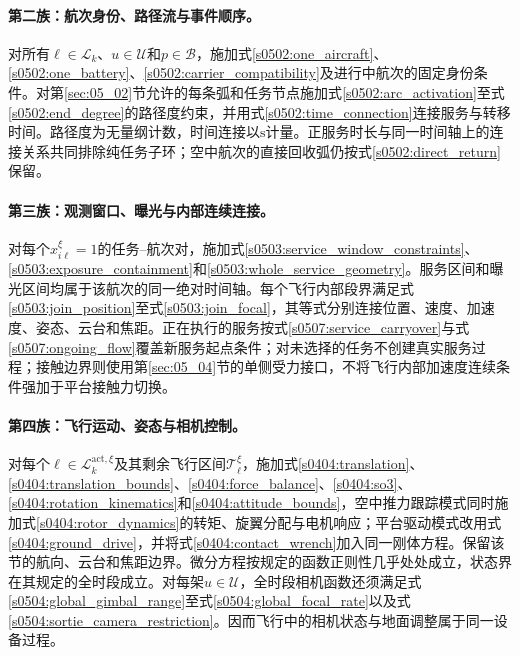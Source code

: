 \paragraph{第二族：航次身份、路径流与事件顺序。}
对所有$\ell\in\mathcal L_k$、$u\in\mathcal U$和$p\in\mathcal B$，施加式\eqref{s0502:one_aircraft}、\eqref{s0502:one_battery}、\eqref{s0502:carrier_compatibility}及进行中航次的固定身份条件。对第\ref{sec:05_02}节允许的每条弧和任务节点施加式\eqref{s0502:arc_activation}至式\eqref{s0502:end_degree}的路径度约束，并用式\eqref{s0502:time_connection}连接服务与转移时间。路径度为无量纲计数，时间连接以$\mathrm s$计量。正服务时长与同一时间轴上的连接关系共同排除纯任务子环；空中航次的直接回收弧仍按式\eqref{s0502:direct_return}保留。

\paragraph{第三族：观测窗口、曝光与内部连续连接。}
对每个$x_{i\ell}^\xi=1$的任务--航次对，施加式\eqref{s0503:service_window_constraints}、\eqref{s0503:exposure_containment}和\eqref{s0503:whole_service_geometry}。服务区间和曝光区间均属于该航次的同一绝对时间轴。每个飞行内部段界满足式\eqref{s0503:join_position}至式\eqref{s0503:join_focal}，其等式分别连接位置、速度、加速度、姿态、云台和焦距。正在执行的服务按式\eqref{s0507:service_carryover}与式\eqref{s0507:ongoing_flow}覆盖新服务起点条件；对未选择的任务不创建真实服务过程；接触边界则使用第\ref{sec:05_04}节的单侧受力接口，不将飞行内部加速度连续条件强加于平台接触力切换。

\paragraph{第四族：飞行运动、姿态与相机控制。}
对每个$\ell\in\mathcal L_k^{\mathrm{act},\xi}$及其剩余飞行区间$\mathcal T_\ell^\xi$，施加式\eqref{s0404:translation}、\eqref{s0404:translation_bounds}、\eqref{s0404:force_balance}、\eqref{s0404:so3}、\eqref{s0404:rotation_kinematics}和\eqref{s0404:attitude_bounds}，空中推力跟踪模式同时施加式\eqref{s0404:rotor_dynamics}的转矩、旋翼分配与电机响应；平台驱动模式改用式\eqref{s0404:ground_drive}，并将式\eqref{s0404:contact_wrench}加入同一刚体方程。保留该节的航向、云台和焦距边界。微分方程按规定的函数正则性几乎处处成立，状态界在其规定的全时段成立。对每架$u\in\mathcal U$，全时段相机函数还须满足式\eqref{s0504:global_gimbal_range}至式\eqref{s0504:global_focal_rate}以及式\eqref{s0504:sortie_camera_restriction}。因而飞行中的相机状态与地面调整属于同一设备过程。

